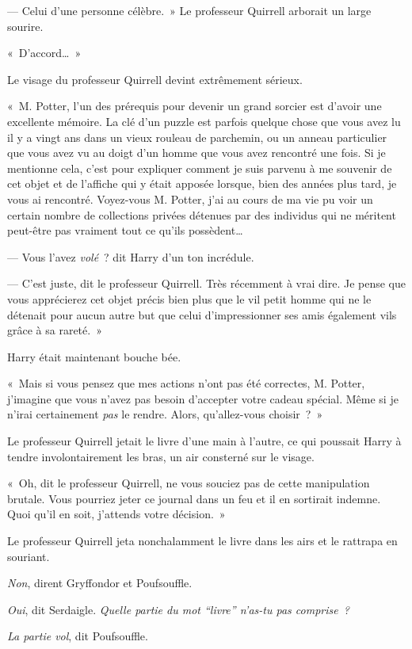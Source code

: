 --- Celui d'une personne célèbre.~»
Le professeur Quirrell arborait un large sourire.

«~D'accord…~»

Le visage du professeur Quirrell devint extrêmement sérieux.

«~M. Potter, l'un des prérequis pour devenir un grand sorcier est d'avoir une excellente mémoire.
La clé d'un puzzle est parfois quelque chose que vous avez lu il y a vingt ans dans un vieux rouleau de parchemin, ou un anneau particulier que vous avez vu au doigt d'un homme que vous avez rencontré une fois.
Si je mentionne cela, c'est pour expliquer comment je suis parvenu à me souvenir de cet objet et de l'affiche qui y était apposée lorsque, bien des années plus tard, je vous ai rencontré.
Voyez-vous M. Potter, j'ai au cours de ma vie pu voir un certain nombre de collections privées détenues par des individus qui ne méritent peut-être pas vraiment tout ce qu'ils possèdent…

--- Vous l'avez \emph{volé}~? dit Harry d'un ton incrédule.

--- C'est juste, dit le professeur Quirrell.
Très récemment à vrai dire.
Je pense que vous apprécierez cet objet précis bien plus que le vil petit homme qui ne le détenait pour aucun autre but que celui d'impressionner ses amis également vils grâce à sa rareté.~»

Harry était maintenant bouche bée.

«~Mais si vous pensez que mes actions n'ont pas été correctes, M. Potter, j'imagine que vous n'avez pas besoin d'accepter votre cadeau spécial.
Même si je n'irai certainement \emph{pas} le rendre.
Alors, qu'allez-vous choisir~?~»

Le professeur Quirrell jetait le livre d'une main à l'autre, ce qui poussait Harry à tendre involontairement les bras, un air consterné sur le visage.

«~Oh, dit le professeur Quirrell, ne vous souciez pas de cette manipulation brutale.
Vous pourriez jeter ce journal dans un feu et il en sortirait indemne.
Quoi qu'il en soit, j'attends votre décision.~»

Le professeur Quirrell jeta nonchalamment le livre dans les airs et le rattrapa en souriant.

\emph{Non}, dirent Gryffondor et Poufsouffle.

\emph{Oui}, dit Serdaigle.
\emph{Quelle partie du mot “livre” n'as-tu pas comprise~?}

\emph{La partie vol}, dit Poufsouffle.

